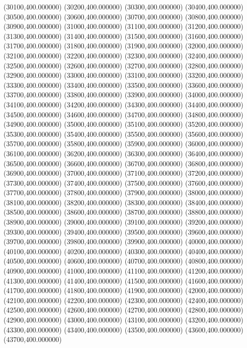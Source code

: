 (30100,400.000000)
(30200,400.000000)
(30300,400.000000)
(30400,400.000000)
(30500,400.000000)
(30600,400.000000)
(30700,400.000000)
(30800,400.000000)
(30900,400.000000)
(31000,400.000000)
(31100,400.000000)
(31200,400.000000)
(31300,400.000000)
(31400,400.000000)
(31500,400.000000)
(31600,400.000000)
(31700,400.000000)
(31800,400.000000)
(31900,400.000000)
(32000,400.000000)
(32100,400.000000)
(32200,400.000000)
(32300,400.000000)
(32400,400.000000)
(32500,400.000000)
(32600,400.000000)
(32700,400.000000)
(32800,400.000000)
(32900,400.000000)
(33000,400.000000)
(33100,400.000000)
(33200,400.000000)
(33300,400.000000)
(33400,400.000000)
(33500,400.000000)
(33600,400.000000)
(33700,400.000000)
(33800,400.000000)
(33900,400.000000)
(34000,400.000000)
(34100,400.000000)
(34200,400.000000)
(34300,400.000000)
(34400,400.000000)
(34500,400.000000)
(34600,400.000000)
(34700,400.000000)
(34800,400.000000)
(34900,400.000000)
(35000,400.000000)
(35100,400.000000)
(35200,400.000000)
(35300,400.000000)
(35400,400.000000)
(35500,400.000000)
(35600,400.000000)
(35700,400.000000)
(35800,400.000000)
(35900,400.000000)
(36000,400.000000)
(36100,400.000000)
(36200,400.000000)
(36300,400.000000)
(36400,400.000000)
(36500,400.000000)
(36600,400.000000)
(36700,400.000000)
(36800,400.000000)
(36900,400.000000)
(37000,400.000000)
(37100,400.000000)
(37200,400.000000)
(37300,400.000000)
(37400,400.000000)
(37500,400.000000)
(37600,400.000000)
(37700,400.000000)
(37800,400.000000)
(37900,400.000000)
(38000,400.000000)
(38100,400.000000)
(38200,400.000000)
(38300,400.000000)
(38400,400.000000)
(38500,400.000000)
(38600,400.000000)
(38700,400.000000)
(38800,400.000000)
(38900,400.000000)
(39000,400.000000)
(39100,400.000000)
(39200,400.000000)
(39300,400.000000)
(39400,400.000000)
(39500,400.000000)
(39600,400.000000)
(39700,400.000000)
(39800,400.000000)
(39900,400.000000)
(40000,400.000000)
(40100,400.000000)
(40200,400.000000)
(40300,400.000000)
(40400,400.000000)
(40500,400.000000)
(40600,400.000000)
(40700,400.000000)
(40800,400.000000)
(40900,400.000000)
(41000,400.000000)
(41100,400.000000)
(41200,400.000000)
(41300,400.000000)
(41400,400.000000)
(41500,400.000000)
(41600,400.000000)
(41700,400.000000)
(41800,400.000000)
(41900,400.000000)
(42000,400.000000)
(42100,400.000000)
(42200,400.000000)
(42300,400.000000)
(42400,400.000000)
(42500,400.000000)
(42600,400.000000)
(42700,400.000000)
(42800,400.000000)
(42900,400.000000)
(43000,400.000000)
(43100,400.000000)
(43200,400.000000)
(43300,400.000000)
(43400,400.000000)
(43500,400.000000)
(43600,400.000000)
(43700,400.000000)
